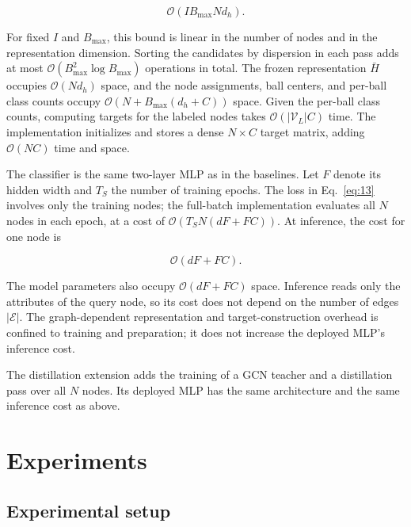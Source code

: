 \documentclass[10pt,letterpaper,nopreprintline]{elsarticle}
\theoremstyle{plain}
\begin{document}
\begin{equation}\label{eq:22}
\mathcal{O}(IB_{\max}Nd_{h}).
\end{equation}

For fixed \(I\) and \(B_{\max}\), this bound is linear in the number of nodes and in the representation dimension. Sorting the candidates by dispersion in each pass adds at most \(\mathcal{O}(B_{\max}^{2}\log B_{\max})\) operations in total. The frozen representation \(\bar{H}\) occupies \(\mathcal{O}(Nd_{h})\) space, and the node assignments, ball centers, and per-ball class counts occupy \(\mathcal{O}(N + B_{\max}(d_{h} + C))\) space. Given the per-ball class counts, computing targets for the labeled nodes takes \(\mathcal{O}(|\mathcal{V}_{L}|C)\) time. The implementation initializes and stores a dense \(N \times C\) target matrix, adding \(\mathcal{O}(NC)\) time and space.

\Needspace{64pt}

The classifier is the same two-layer MLP as in the baselines. Let \(F\) denote its hidden width and \(T_{S}\) the number of training epochs. The loss in Eq.~\eqref{eq:13} involves only the training nodes; the full-batch implementation evaluates all \(N\) nodes in each epoch, at a cost of \(\mathcal{O}(T_{S}N(dF + FC))\). At inference, the cost for one node is

\begin{equation}\label{eq:23}
\mathcal{O}(dF + FC).
\end{equation}

The model parameters also occupy \(\mathcal{O}(dF + FC)\) space. Inference reads only the attributes of the query node, so its cost does not depend on the number of edges \(|\mathcal{E}|\). The graph-dependent representation and target-construction overhead is confined to training and preparation; it does not increase the deployed MLP's inference cost.

The distillation extension adds the training of a GCN teacher and a distillation pass over all \(N\) nodes. Its deployed MLP has the same architecture and the same inference cost as above.

\FloatBarrier

\section{Experiments}\label{sec:4}

\subsection{Experimental setup}\label{sec:4.1}
\end{document}
